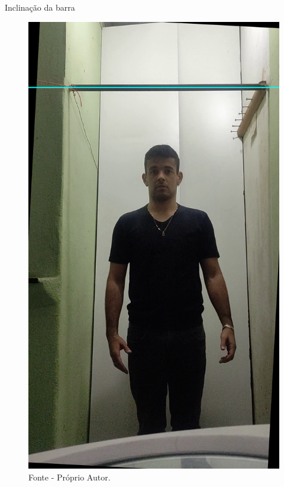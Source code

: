 \begin{frame}{Inclinação da barra}
    \begin{figure}[!ht]
    \centering
    \includegraphics[scale=0.1]{img/desenvolvimento/inclinacaoBarra/barra_rotacionada.png}
    \caption*{Fonte - Próprio Autor.}
    \end{figure}
\end{frame}


